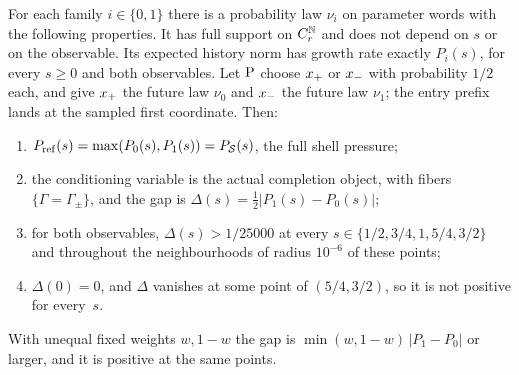 \begin{proposition}\label{prop:positive-gap}
For each family $i\in\{0,1\}$ there is a probability law $\nu_i$ on parameter words with the following properties. It has full support on $C_r^{\mathbb{N}}$ and does not depend on $s$ or on the observable. Its expected history norm has growth rate exactly $P_i(s)$, for every $s\ge0$ and both observables. Let $\mathrm{P}$ choose $x_{+}$ or $x_{-}$ with probability $1/2$ each, and give $x_{+}$ the future law $\nu_0$ and $x_{-}$ the future law $\nu_1$; the entry prefix lands at the sampled first coordinate. Then:
\begin{enumerate}
  \item $P_{\mathrm{ref}}(s)=\max(P_0(s),P_1(s))=P_{\mathcal{S}}(s)$, the full shell pressure;
  \item the conditioning variable is the actual completion object, with fibers $\{\Gamma=\Gamma_\pm\}$, and the gap is $\Delta(s)=\tfrac12|P_1(s)-P_0(s)|$;
  \item for both observables, $\Delta(s)>1/25000$ at every $s\in\{1/2,3/4,1,5/4,3/2\}$ and throughout the neighbourhoods of radius $10^{-6}$ of these points;
  \item $\Delta(0)=0$, and $\Delta$ vanishes at some point of $(5/4,3/2)$, so it is not positive for every~$s$.
\end{enumerate}
With unequal fixed weights $w,1-w$ the gap is $\min(w,1-w)\,|P_1-P_0|$ or larger, and it is positive at the same points.
\end{proposition}

